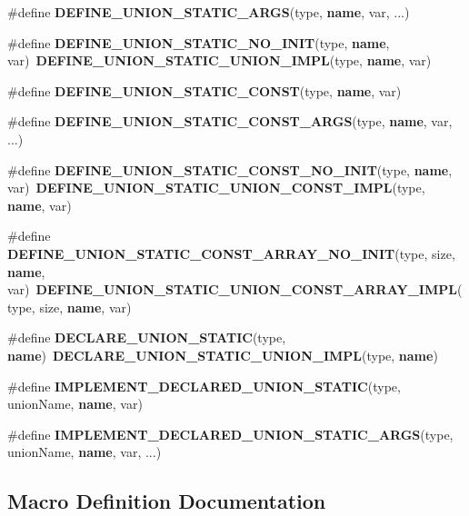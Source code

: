 \begin{DoxyCompactItemize}
\item 
\#define {\bf D\+E\+F\+I\+N\+E\+\_\+\+U\+N\+I\+O\+N\+\_\+\+S\+T\+A\+T\+I\+C\+\_\+\+A\+R\+GS}(type,  {\bf name},  var, ...)
\item 
\#define {\bf D\+E\+F\+I\+N\+E\+\_\+\+U\+N\+I\+O\+N\+\_\+\+S\+T\+A\+T\+I\+C\+\_\+\+N\+O\+\_\+\+I\+N\+IT}(type,  {\bf name},  var)~{\bf D\+E\+F\+I\+N\+E\+\_\+\+U\+N\+I\+O\+N\+\_\+\+S\+T\+A\+T\+I\+C\+\_\+\+U\+N\+I\+O\+N\+\_\+\+I\+M\+PL}(type, {\bf name}, var)
\item 
\#define {\bf D\+E\+F\+I\+N\+E\+\_\+\+U\+N\+I\+O\+N\+\_\+\+S\+T\+A\+T\+I\+C\+\_\+\+C\+O\+N\+ST}(type,  {\bf name},  var)
\item 
\#define {\bf D\+E\+F\+I\+N\+E\+\_\+\+U\+N\+I\+O\+N\+\_\+\+S\+T\+A\+T\+I\+C\+\_\+\+C\+O\+N\+S\+T\+\_\+\+A\+R\+GS}(type,  {\bf name},  var, ...)
\item 
\#define {\bf D\+E\+F\+I\+N\+E\+\_\+\+U\+N\+I\+O\+N\+\_\+\+S\+T\+A\+T\+I\+C\+\_\+\+C\+O\+N\+S\+T\+\_\+\+N\+O\+\_\+\+I\+N\+IT}(type,  {\bf name},  var)~{\bf D\+E\+F\+I\+N\+E\+\_\+\+U\+N\+I\+O\+N\+\_\+\+S\+T\+A\+T\+I\+C\+\_\+\+U\+N\+I\+O\+N\+\_\+\+C\+O\+N\+S\+T\+\_\+\+I\+M\+PL}(type, {\bf name}, var)
\item 
\#define {\bf D\+E\+F\+I\+N\+E\+\_\+\+U\+N\+I\+O\+N\+\_\+\+S\+T\+A\+T\+I\+C\+\_\+\+C\+O\+N\+S\+T\+\_\+\+A\+R\+R\+A\+Y\+\_\+\+N\+O\+\_\+\+I\+N\+IT}(type,  size,  {\bf name},  var)~{\bf D\+E\+F\+I\+N\+E\+\_\+\+U\+N\+I\+O\+N\+\_\+\+S\+T\+A\+T\+I\+C\+\_\+\+U\+N\+I\+O\+N\+\_\+\+C\+O\+N\+S\+T\+\_\+\+A\+R\+R\+A\+Y\+\_\+\+I\+M\+PL}(type, size, {\bf name}, var)
\item 
\#define {\bf D\+E\+C\+L\+A\+R\+E\+\_\+\+U\+N\+I\+O\+N\+\_\+\+S\+T\+A\+T\+IC}(type,  {\bf name})~{\bf D\+E\+C\+L\+A\+R\+E\+\_\+\+U\+N\+I\+O\+N\+\_\+\+S\+T\+A\+T\+I\+C\+\_\+\+U\+N\+I\+O\+N\+\_\+\+I\+M\+PL}(type, {\bf name})
\item 
\#define {\bf I\+M\+P\+L\+E\+M\+E\+N\+T\+\_\+\+D\+E\+C\+L\+A\+R\+E\+D\+\_\+\+U\+N\+I\+O\+N\+\_\+\+S\+T\+A\+T\+IC}(type,  union\+Name,  {\bf name},  var)
\item 
\#define {\bf I\+M\+P\+L\+E\+M\+E\+N\+T\+\_\+\+D\+E\+C\+L\+A\+R\+E\+D\+\_\+\+U\+N\+I\+O\+N\+\_\+\+S\+T\+A\+T\+I\+C\+\_\+\+A\+R\+GS}(type,  union\+Name,  {\bf name},  var, ...)
\end{DoxyCompactItemize}


\subsection{Macro Definition Documentation}
